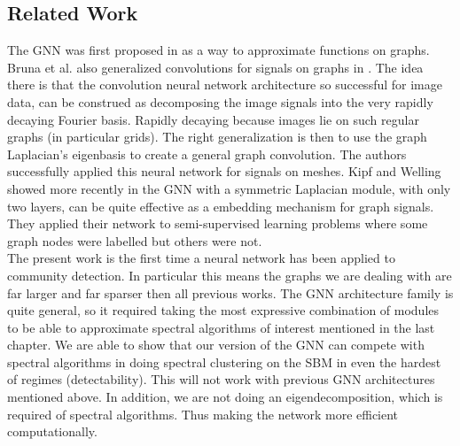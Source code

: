 \subsection{Related Work}
The GNN was first proposed in \cite{GNN} as a way to approximate functions on graphs. Bruna et al. also generalized convolutions for signals on graphs in \cite{Bruna}.  The idea there is that the convolution neural network architecture so successful for image data, can be construed as decomposing the image signals into the very rapidly decaying Fourier basis.  Rapidly decaying because images lie on such regular graphs (in particular grids). The right generalization is then to use the graph Laplacian's eigenbasis to create a general graph convolution.  The authors successfully applied this neural network for signals on meshes.  Kipf and Welling showed more recently in \cite{kipf2016semi} the GNN with a symmetric Laplacian module, with only two layers, can be quite effective as a embedding mechanism for graph signals.  They applied their network to semi-supervised learning problems where some graph nodes were labelled but others were not.\\

The present work is the first time a neural network has been applied to community detection.  In particular this means the graphs we are dealing with are far larger and far sparser then all previous works.  The GNN architecture family is quite general, so it required taking the most expressive combination of modules to be able to approximate spectral algorithms of interest mentioned in the last chapter.  We are able to show that our version of the GNN can compete with spectral algorithms in doing spectral clustering on the SBM in even the hardest of regimes (detectability).  This will not work with previous GNN architectures mentioned above.  In addition, we are not doing an eigendecomposition, which is required of spectral algorithms.  Thus making the network more efficient computationally.  %



